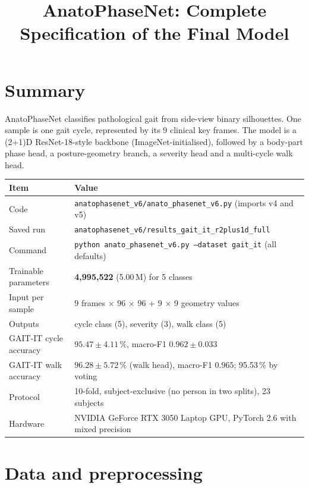 \documentclass[10pt,a4paper]{article}
\title{\textbf{AnatoPhaseNet: Complete Specification of the Final Model}}
\author{}
\date{}
\begin{document}
\maketitle
\vspace{-12mm}

\section{Summary}
AnatoPhaseNet classifies pathological gait from side-view binary silhouettes.
One sample is one gait cycle, represented by its 9 clinical key frames. The
model is a (2+1)D ResNet-18-style backbone (ImageNet-initialised), followed by a
body-part phase head, a posture-geometry branch, a severity head and a
multi-cycle walk head.

\begin{center}
\begin{tabular}{@{}ll@{}}
\toprule
Item & Value \\
\midrule
Code & \texttt{anatophasenet\_v6/anato\_phasenet\_v6.py} (imports v4 and v5) \\
Saved run & \texttt{anatophasenet\_v6/results\_gait\_it\_r2plus1d\_full} \\
Command & \texttt{python anato\_phasenet\_v6.py --dataset gait\_it} (all defaults) \\
Trainable parameters & \textbf{4{,}995{,}522} (5.00\,M) for 5 classes \\
Input per sample & 9 frames $\times$ 96 $\times$ 96 + 9 $\times$ 9 geometry values \\
Outputs & cycle class (5), severity (3), walk class (5) \\
GAIT-IT cycle accuracy & $\mathbf{95.47 \pm 4.11\,\%}$, macro-F1 $0.962 \pm 0.033$ \\
GAIT-IT walk accuracy & $\mathbf{96.28 \pm 5.72\,\%}$ (walk head), macro-F1 $0.965$; 95.53\,\% by voting \\
Protocol & 10-fold, subject-exclusive (no person in two splits), 23 subjects \\
Hardware & NVIDIA GeForce RTX 3050 Laptop GPU, PyTorch 2.6 with mixed precision \\
\bottomrule
\end{tabular}
\end{center}

\section{Data and preprocessing}
\end{document}
